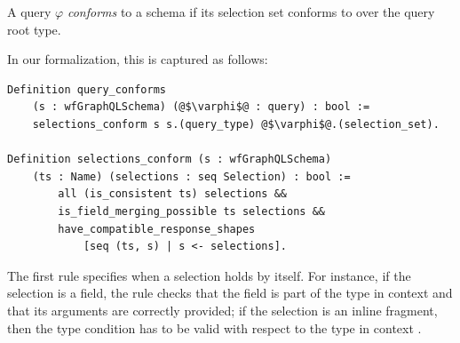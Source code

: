 \begin{definition}
A \gql query $\varphi$ \textit{conforms} to a schema \schema if its selection set conforms to \schema over the query root type.
\end{definition}


In our formalization, this is captured as follows:


\begin{verbatim}
Definition query_conforms 
    (s : wfGraphQLSchema) (@$\varphi$@ : query) : bool :=
    selections_conform s s.(query_type) @$\varphi$@.(selection_set).
    
Definition selections_conform (s : wfGraphQLSchema)
    (ts : Name) (selections : seq Selection) : bool :=
        all (is_consistent ts) selections &&
        is_field_merging_possible ts selections &&
        have_compatible_response_shapes
            [seq (ts, s) | s <- selections].

\end{verbatim}

The first rule specifies when a selection holds by itself. For instance, if the selection is a field, the rule checks that the field is part of the type in context and that its arguments are correctly provided; if the selection is an inline fragment, then the type condition has to be valid with respect to the type in context .%


